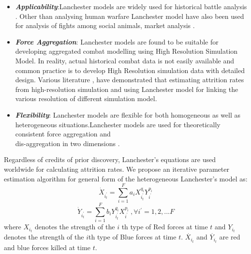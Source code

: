 \documentclass[]{article}
\begin{document}
\begin{itemize}
  \item \textbf{\textit{Applicability}}:Lanchester models are widely used for historical battle analysis \autocite{Engel:1954}. Other than analysing human warfare Lanchester model have also been used for analysis of fights among social animals, market analysis \autocite{remnet:2016}.
  \item \textbf{\textit{Force Aggregation}}: Lanchester models are found to be suitable for developing aggregated combat modelling using High Resolution Simulation Model. In reality, actual historical combat data is not easily available and common practice is to develop High Resolution simulation data with detailed design. Various literature \autocite{Brackney:1959}, \autocite{Das:2007} \autocite{Das:2015} have demonstrated that estimating attrition rates from high-resolution simulation and using Lanchester model for linking the various resolution of different simulation model.
  \item \textbf{\textit{Flexibility}}: Lanchester models are flexible for both homogeneous as well as heterogeneous situations.Lanchester models are used for theoretically consistent force aggregation and \\dis-aggregation in two dimensions \autocite{Taylor:1983,Hillestad:1995}.
\end{itemize}
Regardless of credits of prior discovery, Lanchester's equations are used worldwide for calculating attrition rates. We propose an iterative parameter estimation algorithm for general form of the heterogeneous Lanchester's model as:
\begin{equation} 
      \Dot{X}_{i_{t}^{'}}=\sum_{i=1}^F a_{i}X_{i_{t}^{'}}^{q_{i}}Y_{i_{}^{'}}^{p_{i}}
\end{equation}
\begin{equation}
     \Dot{Y}_{i_{t}^{'}}=\sum_{i=1}^F b_{i}Y_{i_{t}^{'}}^{q_{i}}X_{i_{}^{'}}^{p_{i}}\ ,\forall{i^{'}}=1,2,...F
\end{equation}
where  $X_{{i}_{t}}$ denotes the strength of the $i$ th type of Red forces at time $t$ and  $Y_{{i}_{t}}$ denotes the strength of the $i$th type of Blue forces at time $t$. $\Dot{X_{{i}_{t}}}$ and $\Dot{Y_{{i}_{t}}}$ are red and blue forces killed at time $t$.
\end{document}
